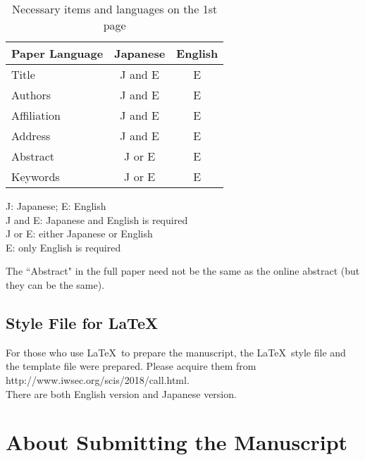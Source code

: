 \documentclass[a4paper]{article}
\begin{document}
\begin{small}
\begin{table}[htbp]
  \begin{center}
    \caption{Necessary items and languages on the 1st page}




      \begin{tabular}{l|c|c} \hline
      Paper Language   & Japanese & English \\
      \hline
      Title            & J and E  &   E     \\
      Authors          & J and E  &   E     \\
      Affiliation      & J and E  &   E     \\
      Address          & J and E  &   E     \\
      Abstract         & J or E   &   E     \\
      Keywords         & J or E   &   E     \\
      \hline
    \end{tabular}
    \label{tab:const}
  \end{center}
      J: Japanese; E: English\\
      J and E: Japanese and English is required \\
      J or E: either Japanese or English\\
      E: only English is required

\end{table}
\end{small}


The ``Abstract" in the full paper need not be the same as the online abstract (but they can be the same).

\subsection{Style File for \LaTeX}

For those who use \LaTeX\ to prepare the manuscript,
the \LaTeX\ style file and the template file were prepared. Please acquire them from \\ \mbox{http://www.iwsec.org/scis/2018/call.html}.\\
There are both English version and Japanese version.

\section{About Submitting the Manuscript}
\end{document}
